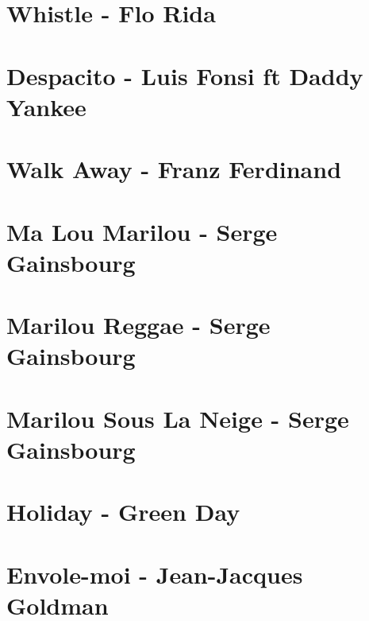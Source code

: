 \documentclass[11pt]{article}
\begin{document}
\section{Whistle - Flo Rida}
\begin{guitar}

\end{guitar}

\section{Despacito - Luis Fonsi ft Daddy Yankee}





\section{Walk Away - Franz Ferdinand}
\begin{guitar}

\end{guitar}


\section{Ma Lou Marilou - Serge Gainsbourg}
\begin{guitar}

\end{guitar}

\section{Marilou Reggae - Serge Gainsbourg}
\begin{guitar}

\end{guitar}

\section{Marilou Sous La Neige - Serge Gainsbourg}
\begin{guitar}

\end{guitar}

\section*{Holiday - Green Day}

\section{Envole-moi - Jean-Jacques Goldman}

\end{document}
